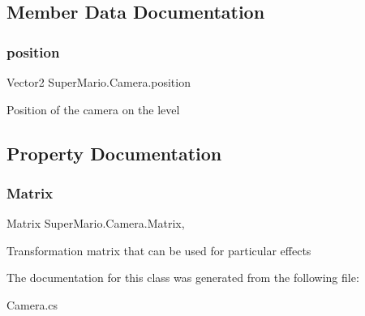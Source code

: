 \subsection{Member Data Documentation}
\mbox{\label{class_super_mario_1_1_camera_a7dad8a59e38607abdc8fc8110e91d8d5}} 
\subsubsection{\texorpdfstring{position}{position}}
{\footnotesize\ttfamily Vector2 Super\+Mario.\+Camera.\+position}



Position of the camera on the level 



\subsection{Property Documentation}
\mbox{\label{class_super_mario_1_1_camera_aa1e50a0b539ec3092518b2c37984bb05}} 
\subsubsection{\texorpdfstring{Matrix}{Matrix}}
{\footnotesize\ttfamily Matrix Super\+Mario.\+Camera.\+Matrix\hspace{0.3cm}{\ttfamily [get]}, {\ttfamily [set]}}



Transformation matrix that can be used for particular effects 



The documentation for this class was generated from the following file\+:\begin{DoxyCompactItemize}
\item 
Camera.\+cs\end{DoxyCompactItemize}
